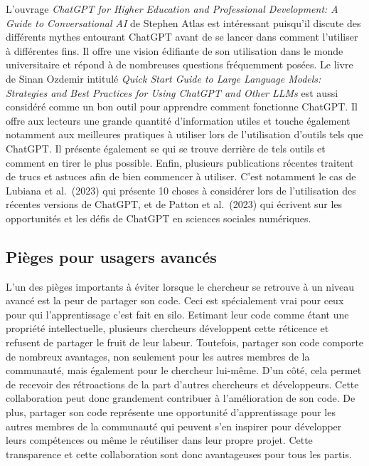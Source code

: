 \documentclass[
  letterpaper,
  DIV=11,
  numbers=noendperiod]{scrreprt}
\begin{document}
L'ouvrage \emph{ChatGPT for Higher Education and Professional
Development: A Guide to Conversational AI} de Stephen Atlas est
intéressant puisqu'il discute des différents mythes entourant ChatGPT
avant de se lancer dans comment l'utiliser à différentes fins. Il offre
une vision édifiante de son utilisation dans le monde universitaire et
répond à de nombreuses questions fréquemment posées. Le livre de Sinan
Ozdemir intitulé \emph{Quick Start Guide to Large Language Models:
Strategies and Best Practices for Using ChatGPT and Other LLMs} est
aussi considéré comme un bon outil pour apprendre comment fonctionne
ChatGPT. Il offre aux lecteurs une grande quantité d'information utiles
et touche également notamment aux meilleures pratiques à utiliser lors
de l'utilisation d'outils tels que ChatGPT. Il présente également se qui
se trouve derrière de tels outils et comment en tirer le plus possible.
Enfin, plusieurs publications récentes traitent de trucs et astuces afin
de bien commencer à utiliser. C'est notamment le cas de Lubiana et
al.~(2023) qui présente 10 choses à considérer lors de l'utilisation des
récentes versions de ChatGPT, et de Patton et al.~(2023) qui écrivent
sur les opportunités et les défis de ChatGPT en sciences sociales
numériques.

\subsection{Pièges pour usagers
avancés}\label{piuxe8ges-pour-usagers-avancuxe9s}

L'un des pièges importants à éviter lorsque le chercheur se retrouve à
un niveau avancé est la peur de partager son code. Ceci est spécialement
vrai pour ceux pour qui l'apprentissage c'est fait en silo. Estimant
leur code comme étant une propriété intellectuelle, plusieurs chercheurs
développent cette réticence et refusent de partager le fruit de leur
labeur. Toutefois, partager son code comporte de nombreux avantages, non
seulement pour les autres membres de la communauté, mais également pour
le chercheur lui-même. D'un côté, cela permet de recevoir des
rétroactions de la part d'autres chercheurs et développeurs. Cette
collaboration peut donc grandement contribuer à l'amélioration de son
code. De plus, partager son code représente une opportunité
d'apprentissage pour les autres membres de la communauté qui peuvent
s'en inspirer pour développer leurs compétences ou même le réutiliser
dans leur propre projet. Cette transparence et cette collaboration sont
donc avantageuses pour tous les partis.
\end{document}
